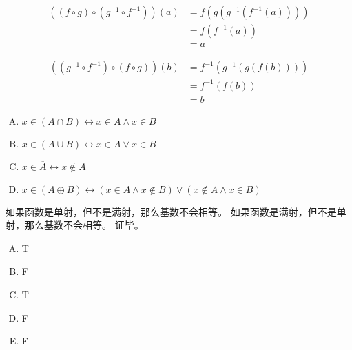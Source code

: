 {{        %
        \begin{practices}
            \begin{align*}
                ((f \circ g) \circ (g^{-1} \circ f^{-1}))(a)
                &= f(g(g^{-1}(f^{-1}(a)))) \\
                &= f(f^{-1}(a)) \\
                &= a
            \end{align*}

            \begin{align*}
                ((g^{-1} \circ f^{-1}) \circ (f \circ g))(b)
                &= f^{-1}(g^{-1}(g(f(b)))) \\
                &= f^{-1}(f(b)) \\
                &= b
            \end{align*}
        \end{practices}

        \begin{practices}
            \begin{enumerate}[A.]
                \item $x \in (A \cap B) \leftrightarrow x \in A \wedge x \in B$
                \item $x \in (A \cup B) \leftrightarrow x \in A \vee x \in B$
                \item $x \in \overline{A} \leftrightarrow x \notin A$
                \item $x \in (A \oplus B) \leftrightarrow (x \in A \wedge x \notin B) \vee (x \notin A \wedge x \in B)$
            \end{enumerate}
        \end{practices}

        \begin{practices}
            如果函数是单射，但不是满射，那么基数不会相等。
            如果函数是满射，但不是单射，那么基数不会相等。
            证毕。
        \end{practices}

        \begin{practices}
            \begin{enumerate}[A.]
                \item T
                \item F
                \item T
                \item F
                \item F
            \end{enumerate}
        \end{practices}

}}
